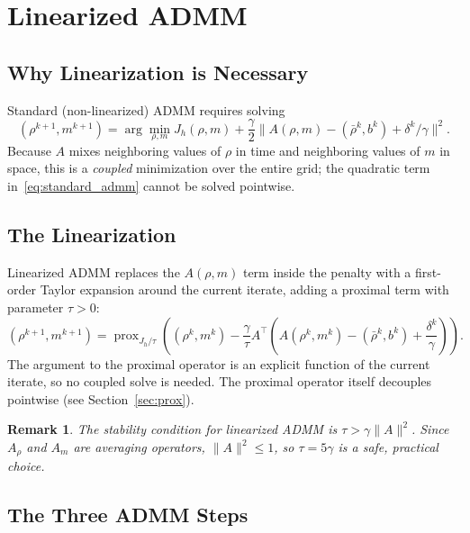 \documentclass[11pt]{article}
\newtheorem{remark}{Remark}
\begin{document}
\section{Linearized ADMM}

\subsection{Why Linearization is Necessary}

Standard (non-linearized) ADMM requires solving
\begin{equation}
  (\rho^{k+1}, m^{k+1})
  = \arg\min_{\rho,m}
    J_h(\rho,m)
    + \frac{\gamma}{2}\|A(\rho,m) - (\bar\rho^k, b^k) + \delta^k/\gamma\|^2.
  \label{eq:standard_admm}
\end{equation}
Because $A$ mixes neighboring values of $\rho$ in time and neighboring values
of $m$ in space, this is a \emph{coupled} minimization over the entire grid;
the quadratic term in~\eqref{eq:standard_admm} cannot be solved pointwise.

\subsection{The Linearization}

Linearized ADMM replaces the $A(\rho,m)$ term inside the penalty with a
first-order Taylor expansion around the current iterate, adding a proximal
term with parameter $\tau > 0$:
\begin{equation}
  (\rho^{k+1}, m^{k+1})
  = \operatorname{prox}_{J_h/\tau}\!\left(
      (\rho^k, m^k) - \frac{\gamma}{\tau}A^\top
      \!\left(A(\rho^k,m^k) - (\bar\rho^k, b^k) + \frac{\delta^k}{\gamma}
      \right)
    \right).
  \label{eq:linearized_step1}
\end{equation}
The argument to the proximal operator is an explicit function of the current
iterate, so no coupled solve is needed.  The proximal operator itself
decouples pointwise (see Section~\ref{sec:prox}).

\begin{remark}
  The stability condition for linearized ADMM is $\tau > \gamma\|A\|^2$.
  Since $A_\rho$ and $A_m$ are averaging operators, $\|A\|^2 \leq 1$, so
  $\tau = 5\gamma$ is a safe, practical choice.
\end{remark}

\subsection{The Three ADMM Steps}
\end{document}
